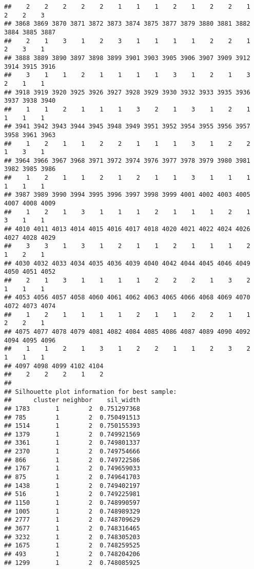 \documentclass[
]{article}
\begin{document}
\begin{verbatim}
##    2    2    2    2    2    1    1    1    2    1    2    2    1    2    2    3 
## 3868 3869 3870 3871 3872 3873 3874 3875 3877 3879 3880 3881 3882 3884 3885 3887 
##    2    1    3    1    2    3    1    1    1    1    2    2    1    2    3    1 
## 3888 3889 3890 3897 3898 3899 3901 3903 3905 3906 3907 3909 3912 3914 3915 3916 
##    3    1    1    2    1    1    1    1    3    1    2    1    3    2    1    1 
## 3918 3919 3920 3925 3926 3927 3928 3929 3930 3932 3933 3935 3936 3937 3938 3940 
##    1    1    2    1    1    1    3    2    1    3    1    2    1    1    1    1 
## 3941 3942 3943 3944 3945 3948 3949 3951 3952 3954 3955 3956 3957 3958 3961 3963 
##    1    2    1    1    2    2    1    1    1    3    1    2    2    1    3    1 
## 3964 3966 3967 3968 3971 3972 3974 3976 3977 3978 3979 3980 3981 3982 3985 3986 
##    1    2    1    1    2    1    2    1    1    3    1    1    1    1    1    1 
## 3987 3989 3990 3994 3995 3996 3997 3998 3999 4001 4002 4003 4005 4007 4008 4009 
##    1    2    1    3    1    1    1    2    1    1    1    2    1    3    1    1 
## 4010 4011 4013 4014 4015 4016 4017 4018 4020 4021 4022 4024 4026 4027 4028 4029 
##    3    3    1    3    1    2    1    1    2    1    1    1    2    1    2    1 
## 4030 4032 4033 4034 4035 4036 4039 4040 4042 4044 4045 4046 4049 4050 4051 4052 
##    2    1    3    1    1    1    1    2    2    2    1    3    2    1    1    1 
## 4053 4056 4057 4058 4060 4061 4062 4063 4065 4066 4068 4069 4070 4072 4073 4074 
##    1    2    1    1    1    1    2    1    1    2    2    1    1    2    2    1 
## 4075 4077 4078 4079 4081 4082 4084 4085 4086 4087 4089 4090 4092 4094 4095 4096 
##    1    1    2    1    3    1    2    2    1    1    2    3    2    1    1    1 
## 4097 4098 4099 4102 4104 
##    2    2    2    1    2 
## 
## Silhouette plot information for best sample:
##      cluster neighbor    sil_width
## 1783       1        2  0.751297368
## 785        1        2  0.750491513
## 1514       1        2  0.750155393
## 1379       1        2  0.749921569
## 3361       1        2  0.749801337
## 2370       1        2  0.749754666
## 866        1        2  0.749722586
## 1767       1        2  0.749659033
## 875        1        2  0.749641703
## 1438       1        2  0.749402197
## 516        1        2  0.749225981
## 1150       1        2  0.748990597
## 1005       1        2  0.748989329
## 2777       1        2  0.748709629
## 3677       1        2  0.748316465
## 3232       1        2  0.748305203
## 1675       1        2  0.748259525
## 493        1        2  0.748204206
## 1299       1        2  0.748085925

\end{verbatim}
\end{document}
